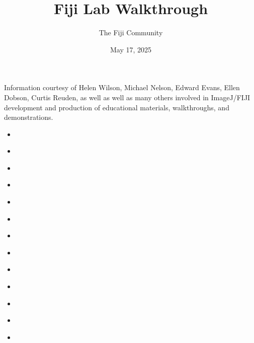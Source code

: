 \documentclass[letterpaper,10pt,english]{jupyterBook}
\title{Fiji Lab Walkthrough}
\date{May 17, 2025}
\author{The Fiji Community}
\begin{document}
\pagestyle{empty}
\sphinxmaketitle
\pagestyle{plain}
\sphinxtableofcontents
\pagestyle{normal}
\label{\detokenize{intro::doc}}


\sphinxAtStartPar
Information courtesy of Helen Wilson, Michael Nelson, Edward Evans, Ellen Dobson, Curtis Reuden,
as well as well as many others involved in ImageJ/FIJI development and production of
educational materials, walkthroughs, and demonstrations.
\begin{itemize}
\item {} 
\sphinxAtStartPar
{\hyperref[\detokenize{installation::doc}]{}}

\item {} 
\sphinxAtStartPar
{\hyperref[\detokenize{keyboard-shortcuts::doc}]{}}

\item {} 
\sphinxAtStartPar
{\hyperref[\detokenize{basics::doc}]{}}

\item {} 
\sphinxAtStartPar
{\hyperref[\detokenize{basic-segmentation::doc}]{}}

\item {} 
\sphinxAtStartPar
{\hyperref[\detokenize{basic-registration::doc}]{}}

\item {} 
\sphinxAtStartPar
{\hyperref[\detokenize{basic-scripting::doc}]{}}

\item {} 
\sphinxAtStartPar
{\hyperref[\detokenize{deconvolution::doc}]{}}

\item {} 
\sphinxAtStartPar
{\hyperref[\detokenize{background-subtraction::doc}]{}}

\item {} 
\sphinxAtStartPar
{\hyperref[\detokenize{trackmate::doc}]{}}

\item {} 
\sphinxAtStartPar
{\hyperref[\detokenize{stardist::doc}]{}}

\item {} 
\sphinxAtStartPar
{\hyperref[\detokenize{labkit::doc}]{}}

\item {} 
\sphinxAtStartPar
{\hyperref[\detokenize{cellpose::doc}]{}}

\item {} 
\sphinxAtStartPar
{\hyperref[\detokenize{extra-resources::doc}]{}}

\end{itemize}
\end{document}
